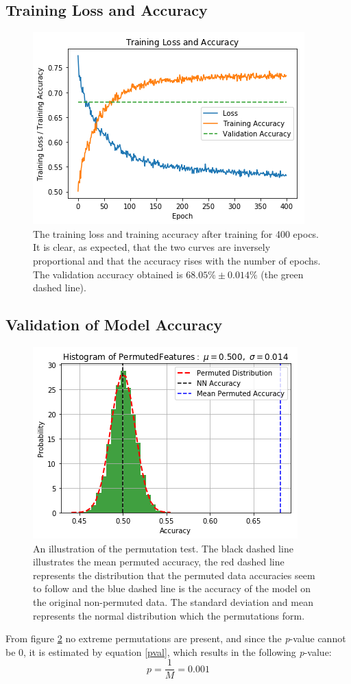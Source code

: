 \documentclass[11pt, fleqn, titlepage]{article}
\begin{document}
	\subsection{Training Loss and Accuracy}\label{training_loss_and_accuracy}
	
	\begin{figure}[H]
		\centering
		\includegraphics[width=0.5\linewidth]{imgs/loss_curve.png}
		\caption{The training loss and training accuracy after training for 400 epocs. It is clear, as expected, that the two curves are inversely proportional and that the accuracy rises with the number of epochs.  The validation accuracy obtained is $ 68.05 \% \pm 0.014 \%$ (the green dashed line).}
		\label{fig:losscurve}
	\end{figure}
	
	\subsection{Validation of Model Accuracy}\label{modelAccuracy}
	
	\begin{figure}[H]
		\centering
		\includegraphics[width=0.5\linewidth]{imgs/perm_test.png}
		\caption{An illustration of the permutation test. The black dashed line illustrates the mean permuted accuracy, the red dashed line represents the distribution that the permuted data accuracies seem to follow and the blue dashed line is the accuracy of the model on the original non-permuted data. The standard deviation and mean represents the normal distribution which the permutations form.}
		\label{fig:permtest}
	\end{figure}\noindent
	From figure \ref{fig:permtest} no extreme permutations are present, and since the \textit{p}-value cannot be 0, it is estimated by equation \ref{pval}, which results in the following \textit{p}-value:
	\[p=\frac{1}{M}=0.001\]
	
\end{document}
